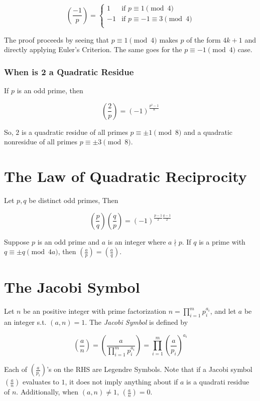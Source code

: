 \documentclass{article}
\begin{document}
\begin{multicols*}{2}
\[
\left(\frac{-1}{p}\right) = \begin{cases}
1 & \text{if } p \equiv 1 \pmod{4} \\
-1 & \text{if } p \equiv -1 \equiv 3 \pmod{4} \\
\end{cases}
\]

The proof proceeds by seeing that $p\equiv 1 \pmod{4}$ makes $p$ of the form $4k +1$ and directly applying Euler's Criterion. The same goes for the $p \equiv -1 \pmod{4}$ case.

\subsubsection*{When is 2 a Quadratic Residue}

If $p$ is an odd prime, then

\[\left(\frac{2}{p}\right) = (-1)^{\frac{p^2 - 1}{8}}\]

So, $2$ is a quadratic residue of all primes $p \equiv \pm 1 \pmod{8}$ and a quadratic nonresidue of all primes $p \equiv \pm 3 \pmod{8}$.

\section{The Law of Quadratic Reciprocity}

Let $p, q$ be distinct odd primes, Then

\[\left(\frac{p}{q}\right)\left(\frac{q}{p}\right) = (-1)^{\frac{p-1}{2}\frac{q-1}{2}}\]

Suppose $p$ is an odd prime and $a$ is an integer where $a \nmid p$. If $q$ is a prime with $q \equiv \pm q \pmod{4a}$, then $\left(\frac{a}{p}\right) = \left(\frac{a}{q}\right)$.

\section{The Jacobi Symbol}

Let $n$ be an positive integer with prime factorization $n = \prod_{i = 1}^mp_i^{a_i}$, and let $a$ be an integer s.t. $(a,n) = 1$. The \textit{Jacobi Symbol} is defined by

\[
\left(\frac{a}{n}\right) = \left(\frac{a}{\prod_{i = 1}^mp_i^{a_i}}\right) = \prod_{i=1}^m\left(\frac{a}{p_i}\right)^{a_i}
\]

Each of $\left(\frac{a}{p_i}\right)$'s on the RHS are Legendre Symbols. Note that if a Jacobi symbol $\left(\frac{a}{n}\right)$ evaluates to $1$, it does not imply anything about if $a$ is a quadrati residue of $n$. Additionally, when $(a, n) \neq 1$, $\left(\frac{a}{n}\right) = 0$.


\end{multicols*}
\end{document}
